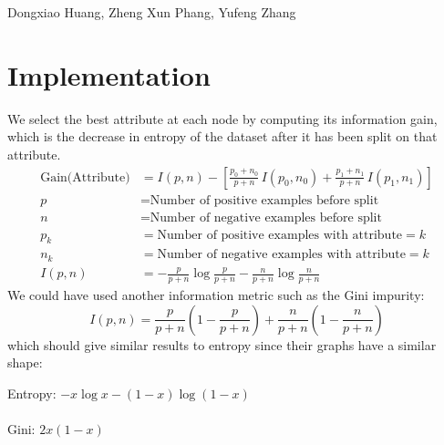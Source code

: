 \documentclass[12pt, a4paper, portrait]{article}
\begin{document}
Dongxiao Huang, Zheng Xun Phang, Yufeng Zhang
\section*{Implementation}
We select the best attribute at each node by computing its information gain, which is the decrease in entropy of the dataset after it has been split on that attribute.
\begin{align*}
    \text{Gain(Attribute)} &= I(p, n) - \left[ \frac{p_0 + n_0}{p + n} \, I(p_0, n_0) + \frac{p_1 + n_1}{p + n} \, I(p_1, n_1) \right] \\[0.5ex]
    p &= \text{Number of positive examples before split} \\
    n &= \text{Number of negative examples before split} \\
    p_k &= \text{Number of positive examples with attribute} = k \\
    n_k &= \text{Number of negative examples with attribute} = k \\
    I(p, n) &= - \frac{p}{p+n} \log \frac{p}{p+n} - \frac{n}{p+n} \log \frac{n}{p+n}
\end{align*}
We could have used another information metric such as the Gini impurity:
\[ I(p, n) = \frac{p}{p+n} \left( 1 - \frac{p}{p+n} \right) + \frac{n}{p+n} \left( 1 - \frac{n}{p+n} \right) \]
which should give similar results to entropy since their graphs have a similar shape:
\begin{center}
\begin{minipage} {0.45 \textwidth}
\end{minipage}
\begin{minipage} [b] {0.4 \textwidth}
    {\color{blue} Entropy: $-x \log x - (1-x) \log (1-x)$} \\
    \\
    {\color{red} Gini: $2x (1-x)$}
\end{minipage}
\end{center}
\end{document}
